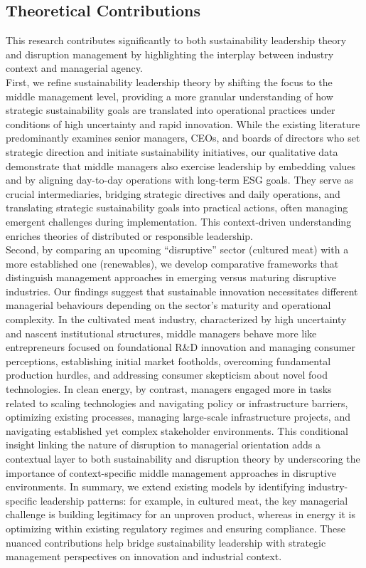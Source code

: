 	\subsection{Theoretical Contributions}
	This research contributes significantly to both sustainability leadership theory and disruption management by highlighting the interplay between industry context and managerial agency. \\
	
	First, we refine sustainability leadership theory by shifting the focus to the middle management level, providing a more granular understanding of how strategic sustainability goals are translated into operational practices under conditions of high uncertainty and rapid innovation. While the existing literature predominantly examines senior managers, CEOs, and boards of directors who set strategic direction and initiate sustainability initiatives, our qualitative data demonstrate that middle managers also exercise leadership by embedding values and by aligning day-to-day operations with long-term ESG goals. They serve as crucial intermediaries, bridging strategic directives and daily operations, and translating strategic sustainability goals into practical actions, often managing emergent challenges during implementation. This context-driven understanding enriches theories of distributed or responsible leadership. \\
	
	Second, by comparing an upcoming ``disruptive'' sector (cultured meat) with a more established one (renewables), we develop comparative frameworks that distinguish management approaches in emerging versus maturing disruptive industries. Our findings suggest that sustainable innovation necessitates different managerial behaviours depending on the sector’s maturity and operational complexity. In the cultivated meat industry, characterized by high uncertainty and nascent institutional structures, middle managers behave more like entrepreneurs focused on foundational R\&D innovation and managing consumer perceptions, establishing initial market footholds, overcoming fundamental production hurdles, and addressing consumer skepticism about novel food technologies. In clean energy, by contrast, managers engaged more in tasks related to scaling technologies and navigating policy or infrastructure barriers, optimizing existing processes, managing large-scale infrastructure projects, and navigating established yet complex stakeholder environments. This conditional insight linking the nature of disruption to managerial orientation adds a contextual layer to both sustainability and disruption theory by underscoring the importance of context-specific middle management approaches in disruptive environments. In summary, we extend existing models by identifying industry-specific leadership patterns: for example, in cultured meat, the key managerial challenge is building legitimacy for an unproven product, whereas in energy it is optimizing within existing regulatory regimes and ensuring compliance. These nuanced contributions help bridge sustainability leadership with strategic management perspectives on innovation and industrial context. \\
	
